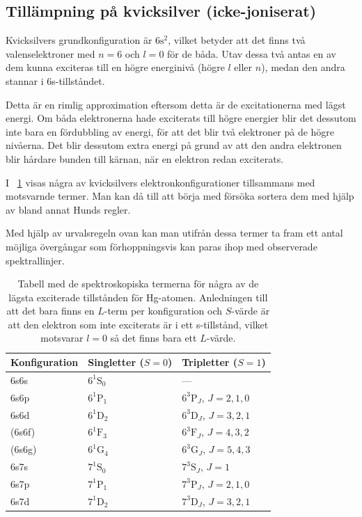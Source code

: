 \documentclass[11pt,a4paper]{article}
\newcommand{\tabref}{\tablename~\ref} %
\begin{document}
\subsection{Tillämpning på kvicksilver (icke-joniserat)}
Kvicksilvers grundkonfiguration är $6\mathrm{s}^2$, vilket betyder att det
finns två valenselektroner med $n=6$ och $l=0$ för de båda. Utav dessa
två antas en av dem kunna exciteras till en högre energinivå (högre
$l$ eller $n$), medan den andra stannar i 6s-tillståndet. 

Detta är en rimlig approximation eftersom detta är de excitationerna
med lägst energi. Om båda elektronerna hade exciterats till högre
energier blir det dessutom inte bara en fördubbling av energi, för att
det blir två elektroner på de högre nivåerna. Det blir dessutom extra
energi på grund av att den andra elektronen blir hårdare bunden till
kärnan, när en elektron redan exciterats. 

I \tabref{tab:Hg_termer} visas några av kvicksilvers
elektronkonfigurationer tillsammans med motsvarnde termer. Man kan då
till att börja med försöka sortera dem med hjälp av bland annat Hunds
regler. 

Med hjälp av urvalsregeln ovan kan man utifrån dessa termer ta fram
ett antal möjliga övergångar som förhoppningsvis kan paras ihop med
observerade spektrallinjer. 


\begin{table}
\centering
\caption{Tabell med de spektroskopiska termerna för några av de lägsta
exciterade tillstånden för Hg-atomen. Anledningen till att det bara
finns en $L$-term per konfiguration och $S$-värde är att den elektron
som inte exciterats är i ett s-tillstånd, vilket motsvarar $l=0$ så
det finns bara ett $L$-värde. }
\label{tab:Hg_termer}
\begin{tabular}{|l|l|l|}\hline
Konfiguration & Singletter ($S=0$) & Tripletter ($S=1$)
\\ \hline\hline
6s6s & $6^1\mathrm{S}_0$ & --- \\
6s6p & $6^1\mathrm{P}_1$ & $6^3\mathrm{P}_J$, $J=2, 1, 0$ \\
6s6d & $6^1\mathrm{D}_2$ & $6^3\mathrm{D}_J$, $J=3, 2, 1$ \\
(6s6f) & $6^1\mathrm{F}_3$ & $6^3\mathrm{F}_J$, $J=4, 3, 2$ \\
(6s6g) & $6^1\mathrm{G}_4$ & $6^3\mathrm{G}_J$, $J=5, 4, 3$ \\
\hline
6s7s & $7^1\mathrm{S}_0$ & $7^3\mathrm{S}_J$, $J=1$ \\
6s7p & $7^1\mathrm{P}_1$ & $7^3\mathrm{P}_J$, $J=2, 1, 0$ \\
6s7d & $7^1\mathrm{D}_2$ & $7^3\mathrm{D}_J$, $J=3, 2, 1$ \\ 
\hline
\end{tabular}
\end{table}
\end{document}
